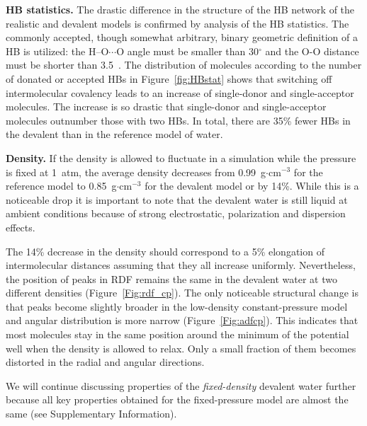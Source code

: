 \documentclass[aps,prl,reprint,amsmath,amssymb]{revtex4-1}
\begin{document}
\textbf{HB statistics.} The drastic difference in the structure of the HB network of the realistic and devalent models is confirmed by analysis of the HB statistics. 
The commonly accepted, though somewhat arbitrary, binary geometric definition of a HB is utilized: the H--O$\cdots$O angle must be smaller than 30$^{\circ}$ and the O-O distance must be shorter than 3.5\Ang~\cite{rey2002hydrogen,lawrence2003vibrational}. 
The distribution of molecules according to the number of donated or accepted HBs in Figure~\ref{fig:HBstat} shows that switching off intermolecular covalency leads to an increase of single-donor and single-acceptor molecules. 
The increase is so drastic that single-donor and single-acceptor molecules outnumber those with two HBs.
In total, there are 35\% fewer HBs in the devalent than in the reference model of water.

\textbf{Density.} If the density is allowed to fluctuate in a simulation while the pressure is fixed at 1~atm, the average density decreases from 0.99~g$\cdot$cm$^{-3}$ for the reference model to 0.85~g$\cdot$cm$^{-3}$ for the devalent model or by 14\%. 
While this is a noticeable drop it is important to note that the devalent water is still liquid at ambient conditions because of strong electrostatic, polarization and dispersion effects. 

The 14\% decrease in the density should correspond to a 5\% elongation of intermolecular distances assuming that they all increase uniformly. Nevertheless, the position of peaks in RDF remains the same in the devalent water at two different densities (Figure~\ref{Fig:rdf_cp}). The only noticeable structural change is that peaks become slightly broader in the low-density constant-pressure model and angular distribution is \blue more narrow (Figure~\ref{Fig:adfcp})\old. This indicates that most molecules stay in the same position around the minimum of the potential well when the density is allowed to relax. Only a small fraction of them becomes distorted in the radial and angular directions. 

We will continue discussing properties of the \emph{fixed-density} devalent water further because all key properties obtained for the fixed-pressure model are almost the same (see Supplementary Information).

\end{document}
